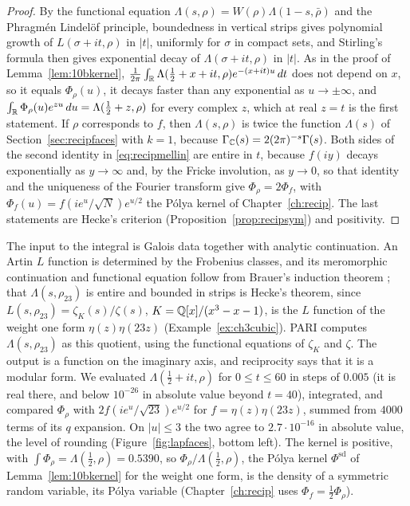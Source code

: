 \begin{proof}
By the functional equation $\Lambda(s,\rho)=W(\rho)\Lambda(1-s,\bar\rho)$ and the Phragm\'en Lindel\"of principle, boundedness in vertical strips gives polynomial growth of $L(\sigma+it,\rho)$ in $|t|$, uniformly for $\sigma$ in compact sets, and Stirling's formula then gives exponential decay of $\Lambda(\sigma+it,\rho)$ in $|t|$. As in the proof of Lemma~\ref{lem:10bkernel}, $\frac1{2\pi}\int_{\mathbb{R}}\Lambda(\frac12+x+it,\rho)e^{-(x+it)u}\,dt$ does not depend on $x$, so it equals $\Phi_\rho(u)$, it decays faster than any exponential as $u\to\pm\infty$, and $\int_{\mathbb{R}}\Phi_\rho(u)e^{zu}\,du=\Lambda(\frac12+z,\rho)$ for every complex $z$, which at real $z=t$ is the first statement. If $\rho$ corresponds to $f$, then $\Lambda(s,\rho)$ is twice the function $\Lambda(s)$ of Section~\ref{sec:recipfaces} with $k=1$, because $\Gamma_{\mathbb{C}}(s)=2(2\pi)^{-s}\Gamma(s)$. Both sides of the second identity in \eqref{eq:recipmellin} are entire in $t$, because $f(iy)$ decays exponentially as $y\to\infty$ and, by the Fricke involution, as $y\to0$, so that identity and the uniqueness of the Fourier transform give $\Phi_\rho=2\Phi_f$, with $\Phi_f(u)=f(ie^u/\sqrt N)e^{u/2}$ the P\'olya kernel of Chapter~\ref{ch:recip}. The last statements are Hecke's criterion (Proposition~\ref{prop:recipsym}) and positivity.
\end{proof}

The input to the integral is Galois data together with analytic continuation. An Artin $L$ function is determined by the Frobenius classes, and its meromorphic continuation and functional equation follow from Brauer's induction theorem \cite{brauer1947}; that $\Lambda(s,\rho_{23})$ is entire and bounded in strips is Hecke's theorem, since $L(s,\rho_{23})=\zeta_K(s)/\zeta(s)$, $K=\mathbb{Q}[x]/(x^3-x-1)$, is the $L$ function of the weight one form $\eta(z)\eta(23z)$ (Example~\ref{ex:ch3cubic}). PARI computes $\Lambda(s,\rho_{23})$ as this quotient, using the functional equations of $\zeta_K$ and $\zeta$. The output is a function on the imaginary axis, and reciprocity says that it is a modular form. We evaluated $\Lambda(\frac12+it,\rho)$ for $0\le t\le60$ in steps of $0.005$ (it is real there, and below $10^{-26}$ in absolute value beyond $t=40$), integrated, and compared $\Phi_\rho$ with $2f(ie^u/\sqrt{23})e^{u/2}$ for $f=\eta(z)\eta(23z)$, summed from $4000$ terms of its $q$ expansion. On $|u|\le3$ the two agree to $2.7\cdot10^{-16}$ in absolute value, the level of rounding (Figure~\ref{fig:lapfaces}, bottom left). The kernel is positive, with $\int\Phi_\rho=\Lambda(\frac12,\rho)=0.5390$, so $\Phi_\rho/\Lambda(\frac12,\rho)$, the P\'olya kernel $\Phi^{\mathrm{sd}}$ of Lemma~\ref{lem:10bkernel} for the weight one form, is the density of a symmetric random variable, its P\'olya variable (Chapter~\ref{ch:recip} uses $\Phi_f=\frac12\Phi_\rho$).

